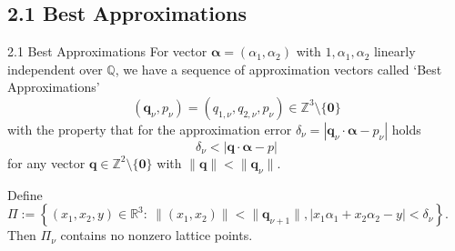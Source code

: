 \documentclass[aspectratio=1610]{beamer}
\begin{document}
\subsection {2.1 Best Approximations}
\begin{frame}{2.1 Best Approximations}
    For vector $\boldsymbol{\alpha}=(\alpha_1, \alpha_2)$ with $1, \alpha_1, \alpha_2$ linearly independent over $\mathbb{Q}$,
    we have a sequence of approximation vectors called `Best Approximations'
    \[
        (\textbf{q}_\nu, p_\nu) = (q_{1,\nu}, q_{2,\nu}, p_\nu) \in \mathbb{Z}^{3}\setminus \{\textbf{0}\}
    \]
    with the property that for the approximation error $\delta_\nu =|\textbf{q}_\nu \cdot \boldsymbol{\alpha} - p_\nu|$ holds
    \[
        \delta_\nu < |\textbf{q}\cdot\boldsymbol{\alpha} - p|
    \]
    for any vector $\textbf{q} \in \mathbb{Z}^2 \setminus \{\textbf{0}\}$ with $\|\textbf{q}\|<\|\textbf{q}_\nu\|$.
    \begin{lemma}
        Define $\Pi := \left\{(x_1, x_2, y) \in \mathbb{R}^3: \ \|(x_1, x_2)\| < \|\textbf{q}_{\nu+1}\|, |x_1\alpha_1 + x_2\alpha_2 - y| < \delta_\nu \right\}$.
        Then $\Pi_\nu$ contains no nonzero lattice points.
    \end{lemma}
\end{frame}
\end{document}
